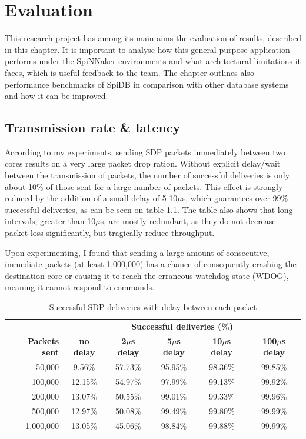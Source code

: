\chapter{Evaluation}
\label{cha:eval}
This research project has among its main aims the evaluation of results, described in this chapter. It is important to analyse how this general purpose application performs under the SpiNNaker environments and what architectural limitations it faces, which is useful feedback to the team. The chapter outlines also performance benchmarks of SpiDB in comparison with other database systems and how it can be improved.

\section{Transmission rate \& latency}
\label{sec:eval_comm_rel}

According to my experiments, sending SDP packets immediately between two cores results on a very large packet drop ration. Without explicit delay/wait between the transmission of packets, the number of successful deliveries is only about 10\% of those sent for a large number of packets. This effect is strongly reduced by the addition of a small delay of 5-10$\mu$s, which guarantees over 99\% successful deliveries, as can be seen on table \ref{table:sdp_deliveries}. The table also shows that long intervals, greater than 10$\mu$s, are mostly redundant, as they do not decrease packet loss significantly, but tragically reduce throughput.

Upon experimenting, I found that sending a large amount of consecutive, immediate packets (at least 1,000,000) has a chance of consequently crashing the destination core or causing it to reach the erraneous watchdog state (WDOG), meaning it cannot respond to commands.

\begin{table}
\begin{tabular}{ r | c | c | c | c | c }
 & \multicolumn{5}{c}{\textbf{Successful deliveries (\%)}} \\

\textbf{Packets sent} & \textbf{no delay} & \textbf{2$\mu$s delay} & \textbf{5$\mu$s delay} & \textbf{10$\mu$s delay} & \textbf{100$\mu$s delay} \\
50,000 & 9.56\% & 57.73\% & 95.95\% & 98.36\% & 99.85\% \\
100,000 & 12.15\% & 54.97\% & 97.99\% & 99.13\% & 99.92\% \\
200,000 & 13.07\% & 50.55\% & 99.01\% & 99.33\% & 99.96\% \\
500,000 & 12.97\% & 50.08\% & 99.49\% & 99.80\% & 99.99\% \\
1,000,000 & 13.05\% & 45.06\% & 98.84\% & 99.88\% & 99.99\% \\
\end{tabular}
\caption{Successful SDP deliveries with delay between each packet}
\label{table:sdp_deliveries}
\end{table}

